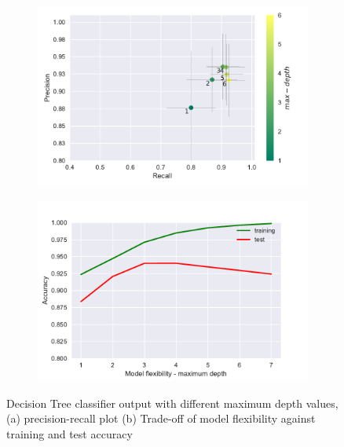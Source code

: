 \documentclass[12pt, a4paper]{scrartcl}
\begin{document}
\begin{figure}[h]
    \centering
    \begin{subfigure}{0.45\textwidth}
        \includegraphics[width=\textwidth]{prec_recall_dt_maxdepth}
        \caption{}
        \label{fig:prec_recall_dt_maxdepth}
    \end{subfigure}
    \begin{subfigure}{0.45\textwidth}
        \includegraphics[width=\textwidth]{tradeoff_dt_maxdepth}
        \caption{}
        \label{fig:tradeoff_dt_maxdepth}
    \end{subfigure}
    \caption{Decision Tree classifier output with different maximum depth values, (a) precision-recall plot (b) Trade-off of model flexibility against training and test accuracy}\label{fig:DT_maxdepth}
\end{figure}
\end{document}
